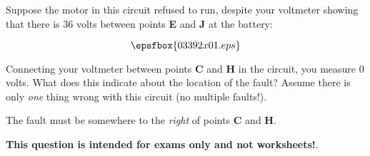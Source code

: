 

Suppose the motor in this circuit refused to run, despite your voltmeter showing that there is 36 volts between points {\bf E} and {\bf J} at the battery:

$$\epsfbox{03392x01.eps}$$

Connecting your voltmeter between points {\bf C} and {\bf H} in the circuit, you measure 0 volts.  What does this indicate about the location of the fault?  Assume there is only {\it one} thing wrong with this circuit (no multiple faults!).







The fault must be somewhere to the {\it right} of points {\bf C} and {\bf H}.







{\bf This question is intended for exams only and not worksheets!}.



